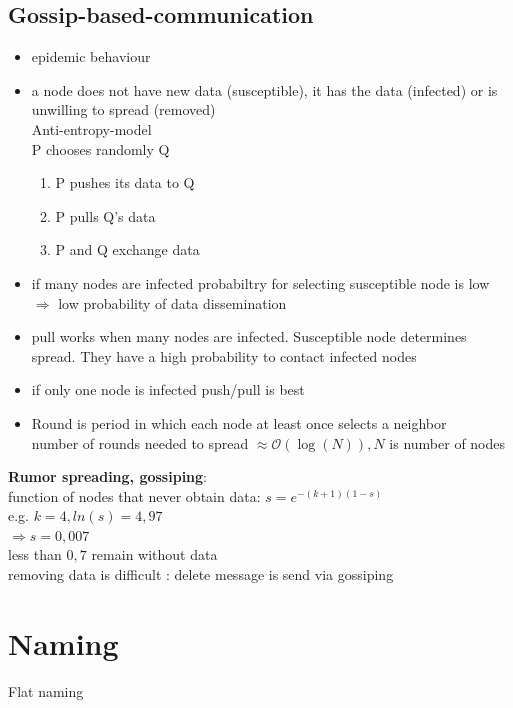 \documentclass[ngerman,a4paper]{report}
\begin{document}
\subsection{Gossip-based-communication}
\begin{itemize}
	\item epidemic behaviour
	\item a node does not have new data (susceptible), it has the data (infected) or is unwilling to spread (removed)\\
	Anti-entropy-model\\
	P chooses randomly Q\\
	\begin{enumerate}
		\item P pushes its data to Q
		\item P pulls Q's data
		\item P and Q exchange data
	\end{enumerate}
	\item if many nodes are infected probabiltry for selecting susceptible node  is low\\
	$\Rightarrow$ low probability of data dissemination\\
	\item pull works when many nodes are infected. Susceptible node determines spread. They have a high probability to contact infected nodes
	\item if only one node is infected push/pull is best
	\item Round is period in which each node at least once selects a neighbor\\
		number of rounds needed to spread  $\approx \mathcal{O}(\log(N)), N$ is number of nodes\\
\end{itemize}
\textbf{Rumor spreading, gossiping}:\\
function of nodes that never obtain data: $s=e^{-(k+1)(1-s)}$\\
e.g. $k=4, ln(s) = 4,97$\\
$\Rightarrow s = 0,007$\\
less than $0,7$ remain without data\\
removing data is difficult : delete message is send via gossiping

\section{Naming}
Flat naming\\
\end{document}
